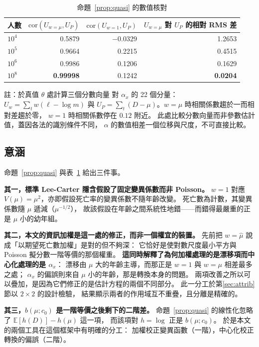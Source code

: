 \documentclass[UTF8, fontset=macnew, a4paper, 12pt]{ctexart}
\newcommand{\Ex}{\mathbb{E}}
\begin{document}
\begin{table}[H]
\centering
\caption{命題~\ref{prop:quasi} 的數值核對}
\small
\renewcommand{\arraystretch}{1.1}
\begin{tabular}{lrrr}
\toprule
人數 & $\mathrm{cor}(U_{w=\mu},U_P)$ & $\mathrm{cor}(U_{w=1},U_P)$
& $U_{w=\mu}$ 對 $U_P$ 的相對 RMS 差\\
\midrule
$10^4$ & 0.5879 & $-0.0329$ & 1.2653\\
$10^5$ & 0.9664 & 0.2215 & 0.4515\\
$10^6$ & 0.9986 & 0.1206 & 0.1629\\
$10^8$ & \textbf{0.99998} & 0.1242 & \textbf{0.0204}\\
\bottomrule
\end{tabular}

\vspace{2pt}
\parbox{0.92\textwidth}{\footnotesize 註：於真值 $\theta$ 處計算三個分數向量
對 $\alpha_x$ 的 22 個分量：$U_{w}=\sum_t w(\ell-\log m)$ 與
$U_P=\sum_t(D-\mu)$。$w=\mu$ 時相關係數趨於一而相對差趨於零，
$w=1$ 時相關係數停在 $0.12$ 附近。
此處比較分數向量而非參數估計值，蓋因各法的識別條件不同，
$\alpha$ 的數值相差一個位移與尺度，不可直接比較。}
\label{tab:quasicheck}
\end{table}

\subsection{意涵}\label{subsec:implication}

命題~\ref{prop:quasi} 與表~\ref{tab:quasicheck} 給出三件事。

\textbf{其一，標準 Lee-Carter 隱含假設了固定變異係數而非 Poisson。}
$w=1$ 對應 $V(\mu)=\mu^2$，亦即假設死亡率的變異係數不隨年齡改變。
死亡數為計數，其變異係數隨 $\mu$ 遞減（$\mu^{-1/2}$），
故該假設在年齡之間系統性地錯——而錯得最嚴重的正是 $\mu$ 小的幼年組。

\textbf{其二，本文的資訊加權是這一處的修正，而非一個權宜的裝置。}
先前把 $w=\hat\mu$ 說成「以期望死亡數加權」是對的但不夠深：
它恰好是使對數尺度最小平方與 Poisson 擬分數一階等價的那個權重。
\textbf{這同時解釋了為何加權處理的是漂移項而中心化處理的是 $\alpha_x$}：
漂移由 $\mu$ 大的年齡主導，而那正是 $w=1$ 與 $w=\mu$ 相差最多之處；
$\alpha_x$ 的偏誤則來自 $\mu$ 小的年齡，那是轉換本身的問題。
兩項改善之所以可以疊加，是因為它們修正的是估計方程的兩個不同部分。
此一分工於第\ref{sec:attrib}節以 $2\times2$ 的設計檢驗，
結果顯示兩者的作用域互不重疊，且分離是精確的。

\textbf{其三，$b(\mu;c_0)$ 是一階等價之後剩下的二階差。}
命題~\ref{prop:quasi} 的線性化忽略了 $\Ex[h(D)]-h(\mu)$ 這一項，
而該項對 $h=\log$ 正是 $b(\mu;c_0)$。
於是本文的兩個工具在這個框架中有明確的分工：
加權校正變異函數（一階），中心化校正轉換的偏誤（二階）。
\end{document}
